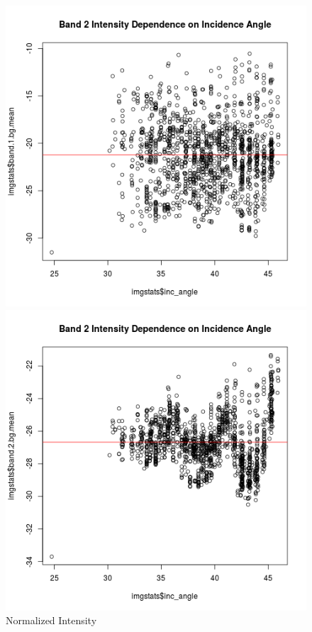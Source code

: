 \documentclass[fleqn,10pt]{SelfArx} %
\begin{document}
\begin{figure}\centering
	\begin{minipage}{0.45\linewidth}
		\includegraphics[width=.9\linewidth]{iceberg/analysis/b1_bg_intensity-ing_angle.png}
	\end{minipage}%
	\begin{minipage}{0.45\linewidth}
		\includegraphics[width=.9\linewidth]{iceberg/analysis/b2_bg_intensity-ing_angle.png}
	\end{minipage}
	\caption{Normalized Intensity}\label{inc_angle2}
\end{figure}
\end{document}
